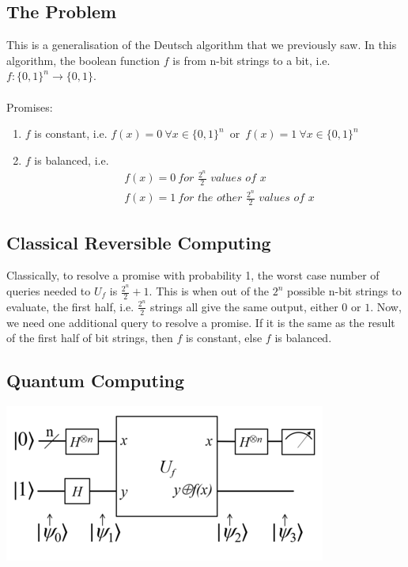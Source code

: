 \documentclass{article}
\begin{document}
    \subsection{The Problem}
    This is a generalisation of the Deutsch algorithm that we previously saw. In this algorithm, the boolean function $f$ is from n-bit strings to a bit, i.e.\\
    \mbox{$f: \{0,1 \}^n \rightarrow \{0,1\}$}.\\
    \\
    Promises:
    \begin{enumerate}[label=(\roman*)]
        \item $f$ is constant, i.e. \mbox{$f(x)=0 \ \forall x \in \{0,1\}^n$ or $f(x)=1 \ \forall x \in \{0,1\}^n$}
        \item $f$ is balanced, i.e. 
        \begin{align*}
            &f(x)=0 \ \textit{for } \frac{2^n}{2} \textit{ values of $x$}\\
            &f(x)=1 \ \textit{for the other } \frac{2^n}{2} \textit{ values of $x$}
        \end{align*}
    \end{enumerate}

    \subsection{Classical Reversible Computing}
    Classically, to resolve a promise with probability 1, the worst case number of queries needed to $U_f$ is $\frac{2^n}{2} + 1$. This is when out of the $2^n$ possible n-bit strings to evaluate, the first half, i.e. $\frac{2^n}{2}$ strings all give the same output, either $0$ or $1$. Now, we need one additional query to resolve a promise. If it is the same as the result of the first half of bit strings, then $f$ is constant, else $f$ is balanced.

    \subsection{Quantum Computing}
    \includegraphics{images/400px-Deutsch-Jozsa-algorithm-quantum-circuit.png}
    \\
\end{document}
